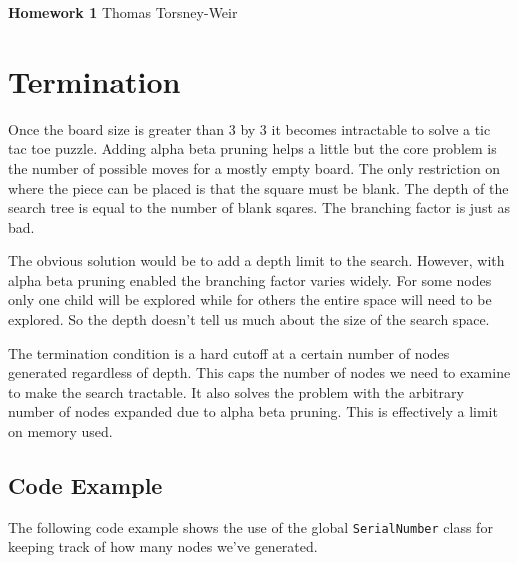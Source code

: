 \documentclass[10pt]{article}
\begin{document}
{\bf Homework 1} \hfill {\raggedleft Thomas Torsney-Weir}

\section{Termination}
Once the board size is greater than 3 by 3 it becomes intractable to solve
a tic tac toe puzzle.  Adding alpha beta pruning helps a little but the core
problem is the number of possible moves for a mostly empty board.  The only
restriction on where the piece can be placed is that the square must be blank.
The depth of the search tree is equal to the number of blank sqares.  The
branching factor is just as bad.  

The obvious solution would be to add a depth limit to the search.  However,
with alpha beta pruning enabled the branching factor varies widely.  For some
nodes only one child will be explored while for others the entire space will
need to be explored.  So the depth doesn't tell us much about the size of the
search space.

The termination condition is a hard cutoff at a certain number of nodes 
generated regardless of depth.  This caps the number of nodes we need
to examine to make the search tractable.  It also solves the problem with the
arbitrary number of nodes expanded due to alpha beta pruning.  This is 
effectively a limit on memory used.

\subsection{Code Example}
The following code example shows the use of the global {\tt SerialNumber}
class for keeping track of how many nodes we've generated.
\end{document}
